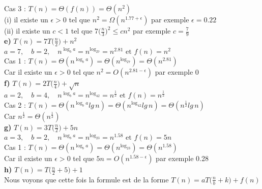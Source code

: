 \documentclass[12pt]{article}
\begin{document}
Cas 3 : \(T(n)=\Theta(f(n))= \Theta(n^2) \) \\

(i) il existe un \(\epsilon>0\) tel que \(n^2 = \Omega(n^{1.77+\epsilon}) \) par exemple \(\epsilon=0.22\) \\
(ii) il existe un \(c < 1\) tel que \( 7 \big(\frac{n}{3} \big)^2 \leq cn^2 \) par exemple \(c=\frac{7}{9}\) \\

\textbf{e) } \(T(n)=7T\big(\frac{n}{2}\big)+n^2\) \\

\(a=7, \quad b=2, \quad n^{\log_ba} = n^{\log_27}=n^{2.81} \text{ et } f(n) = n^2\) \\

Cas 1 : \(T(n) = \Theta(n^{\log_ba}) = \Theta(n^{\log_27}) = \Theta(n^{2.81}) \) \\

Car il existe un \(\epsilon>0\) tel que \(n^2 = O(n^{2.81-\epsilon}) \) par exemple 0 \\

\textbf{f) } \(T(n)=2T\big(\frac{n}{4}\big)+\sqrt{n}\) \\

\(a=2, \quad b=4, \quad n^{\log_ba} = n^{\log_42}=n^{\frac{1}{2}} \text{ et } f(n) = n^{\frac{1}{2}}\) \\

Cas 2 : \(T(n) = \Theta(n^{\log_ba}lg \, n) = \Theta(n^{\log_42}lg \, n) = \Theta(n^{\frac{1}{2}}lg \, n) \) \\

Car \(n^{\frac{1}{2}} = \Theta(n^{\frac{1}{2}}) \) \\

\textbf{g) } \(T(n)=3T\big(\frac{n}{2}\big)+5n\) \\

\(a=3, \quad b=2, \quad n^{\log_ba} = n^{\log_23}=n^{1.58} \text{ et } f(n) = 5n\) \\

Cas 1 : \(T(n) = \Theta(n^{\log_ba}) = \Theta(n^{\log_23}) = \Theta(n^{1.58}) \) \\

Car il existe un \(\epsilon>0\) tel que \(5n = O(n^{1.58-\epsilon}) \) par exemple 0.28 \\

\textbf{h) } \(T(n)=T\big(\frac{n}{2}+5\big)+1\) \\

Nous voyons que cette fois la formule est de la forme \(T(n) = aT \big(\frac{n}{b}+k \big) + f(n) \) \\
\end{document}
